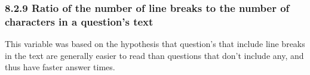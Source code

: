 \documentclass{article}
\begin{document}

\subsubsection*{8.2.9 Ratio of the number of line breaks to the number of characters in a question's text}

This variable was based on the hypothesis that question's that include line breaks in the text are generally easier to read than questions that don't include any, and thus have faster answer times. 






\end{document}
